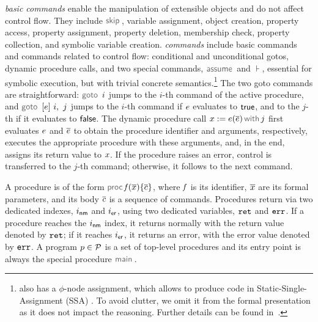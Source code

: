 \jsil \emph{basic commands} enable the manipulation of extensible objects and do not affect control flow. 
They include $\jsilskip$, variable assignment, object creation, property access, property assignment, property deletion, membership check,  property collection, and symbolic variable creation. 
%
\jsil \emph{commands} include \jsil basic commands and commands related to control flow: conditional and unconditional gotos, dynamic procedure calls, and two special commands, $\assume$ and $\assert$, essential for symbolic execution, but with trivial concrete semantics.\footnote{\jsil also has a $\phi$-node assignment, which allows \JSComp to produce code in Static-Single-Assignment (SSA) \cite{SSA}. To avoid clutter, we omit it from the formal presentation as it does not impact the reasoning. Further details can be found in~\cite{javert}.} 
The two goto commands are straightforward: $\goto \ i$ jumps to the $i$-th command of the active procedure, and $\ifgoto{\jsilexpr}{i}{j}$ jumps to the $i$-th command if $e$ evaluates to ${\sf true}$, and to the $j$-th if it evaluates to ${\sf false}$. 
The dynamic procedure call $\jsilcall{\jvar}{\jsilexpr}{\jvec{\jsilexpr}}{j}$ first evaluates  $e$ and $\overline{e}$ to obtain the procedure identifier and arguments, respectively, executes the appropriate procedure with these arguments, and, in the end, assigns its return value to $x$.
If the procedure raises an error, control is transferred to the $j$-th command; otherwise, it follows to the next command. 

A \jsil procedure is of the form $\procedure{\pid}{\jvec{\jvar}}{\jvec{\jcmd}}$, where $\mathit{f}$ is its identifier, $\overline{x}$ are its formal parameters, and its body ${\overline{c}}$  is a sequence of \jsil commands. Procedures return via two dedicated indexes, $i_{{\sf nm}}$ and $i_{{\sf er}}$, using two dedicated variables, $\mathtt{ret}$ and $\mathtt{err}$. If a procedure reaches the $i_{{\sf nm}}$ index, it returns normally with the return value denoted by $\mathtt{ret}$; if it reaches $i_{{\sf er}}$, it returns an error, with the error value denoted by $\mathtt{err}$.
A \jsil program $p \in \mathcal{P}$ is a set of top-level procedures and its entry point is always the special procedure $\jsilmain$\hspace{-2pt}.


%

